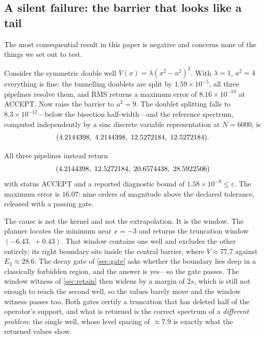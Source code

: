 \documentclass[twocolumn,10pt,a4paper]{article}
\theoremstyle{plain}
\theoremstyle{definition}
\newcommand{\eps}{\varepsilon}
\newcommand{\ACCEPT}{\textsf{ACCEPT}}
\begin{document}
\subsection{A silent failure: the barrier that looks like a tail}
\label{sec:advfailure}

The most consequential result in this paper is negative and concerns none of the
things we set out to test.

Consider the symmetric double well $V(x) = \lambda(x^{2}-a^{2})^{2}$. With
$\lambda = 1$, $a^{2} = 4$ everything is fine: the tunnelling doublets are split
by $1.59\times10^{-5}$, all three pipelines resolve them, and RMS returns a
maximum error of $8.16\times10^{-10}$ at \ACCEPT{}. Now raise the barrier to
$a^{2} = 9$. The doublet splitting falls to $8.3\times10^{-12}$---below the
bisection half-width---and the reference spectrum, computed independently by a
sinc discrete variable representation \citep{colbert1992} at $N = 6000$, is
\begin{equation*}
\small (4.2144398,\ 4.2144398,\ 12.5272184,\ 12.5272184).
\end{equation*}

All three pipelines instead return
\begin{equation*}
\small (4.2144398,\ 12.5272184,\ 20.6574438,\ 28.5922506)
\end{equation*}
with status \ACCEPT{} and a reported diagnostic bound of
$1.58\times10^{-9} \le \eps$. The maximum error is $16.07$: nine orders of
magnitude above the declared tolerance, released with a passing gate.

The cause is not the kernel and not the extrapolation. It is the window. The
planner locates the minimum near $x = -3$ and returns the truncation window
$(-6.43,\ +0.43)$. That window contains one well and excludes the other
entirely; its right boundary sits inside the central barrier, where
$V \approx 77.7$ against $E_{3} \approx 28.6$. The decay gate of
\cref{sec:gate} asks whether the boundary lies deep in a classically forbidden
region, and the answer is yes---so the gate passes. The window witness of
\cref{sec:retain} then widens by a margin of $2s$, which is still not enough to
reach the second well, so the values barely move and the window witness passes
too. Both gates certify a truncation that has deleted half of the operator's
support, and what is returned is the correct spectrum of a \emph{different
problem}: the single well, whose level spacing of $\approx 7.9$ is exactly what
the returned values show.
\end{document}
